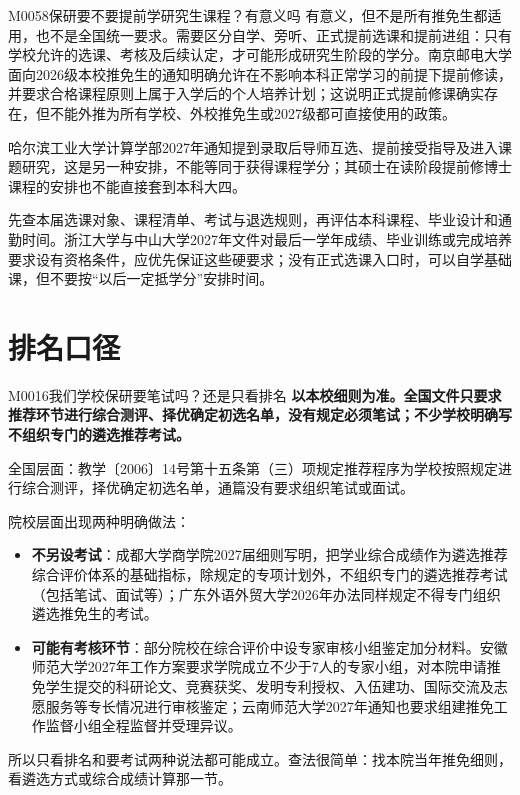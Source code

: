 \begin{qa}{M0058}{保研要不要提前学研究生课程？有意义吗}
有意义，但不是所有推免生都适用，也不是全国统一要求。需要区分自学、旁听、正式提前选课和提前进组：只有学校允许的选课、考核及后续认定，才可能形成研究生阶段的学分。南京邮电大学面向2026级本校推免生的通知明确允许在不影响本科正常学习的前提下提前修读，并要求合格课程原则上属于入学后的个人培养计划；这说明正式提前修课确实存在，但不能外推为所有学校、外校推免生或2027级都可直接使用的政策。

哈尔滨工业大学计算学部2027年通知提到录取后导师互选、提前接受指导及进入课题研究，这是另一种安排，不能等同于获得课程学分；其硕士在读阶段提前修博士课程的安排也不能直接套到本科大四。

先查本届选课对象、课程清单、考试与退选规则，再评估本科课程、毕业设计和通勤时间。浙江大学与中山大学2027年文件对最后一学年成绩、毕业训练或完成培养要求设有资格条件，应优先保证这些硬要求；没有正式选课入口时，可以自学基础课，但不要按“以后一定抵学分”安排时间。 
\end{qa}

\section{排名口径}
\begin{qa}{M0016}{我们学校保研要笔试吗？还是只看排名}
\textbf{以本校细则为准。全国文件只要求推荐环节进行综合测评、择优确定初选名单，没有规定必须笔试；不少学校明确写不组织专门的遴选推荐考试。}

全国层面：教学〔2006〕14号第十五条第（三）项规定推荐程序为学校按照规定进行综合测评，择优确定初选名单，通篇没有要求组织笔试或面试。

院校层面出现两种明确做法：

\begin{itemize}
  \item \textbf{不另设考试}：成都大学商学院2027届细则写明，把学业综合成绩作为遴选推荐综合评价体系的基础指标，除规定的专项计划外，不组织专门的遴选推荐考试（包括笔试、面试等）；广东外语外贸大学2026年办法同样规定不得专门组织遴选推免生的考试。
  \item \textbf{可能有考核环节}：部分院校在综合评价中设专家审核小组鉴定加分材料。安徽师范大学2027年工作方案要求学院成立不少于7人的专家小组，对本院申请推免学生提交的科研论文、竞赛获奖、发明专利授权、入伍建功、国际交流及志愿服务等专长情况进行审核鉴定；云南师范大学2027年通知也要求组建推免工作监督小组全程监督并受理异议。
\end{itemize}

所以只看排名和要考试两种说法都可能成立。查法很简单：找本院当年推免细则，看遴选方式或综合成绩计算那一节。
\end{qa}

